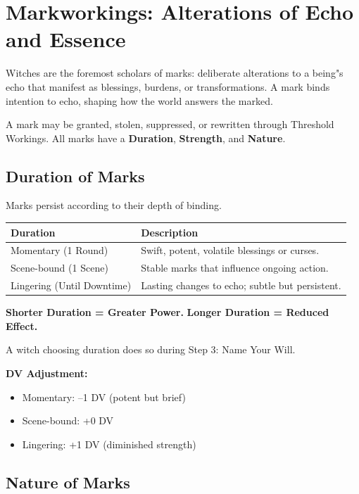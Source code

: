 \documentclass[11pt]{book}
\begin{document}
\section*{Markworkings: Alterations of Echo and Essence}

Witches are the foremost scholars of marks: deliberate alterations to a being"s
echo that manifest as blessings, burdens, or transformations. A mark binds intention
to echo, shaping how the world answers the marked.

A mark may be granted, stolen, suppressed, or rewritten through Threshold Workings.
All marks have a \textbf{Duration}, \textbf{Strength}, and \textbf{Nature}.

\subsection*{Duration of Marks}

Marks persist according to their depth of binding.

\begin{center}
\begin{longtable}{p{} p{}}
\toprule
\textbf{Duration} & \textbf{Description} \\
\midrule
Momentary (1 Round) & Swift, potent, volatile blessings or curses. \\
Scene-bound (1 Scene) & Stable marks that influence ongoing action. \\
Lingering (Until Downtime) & Lasting changes to echo; subtle but persistent. \\
\bottomrule
\end{longtable}
\end{center}

\textbf{Shorter Duration = Greater Power.}  
\textbf{Longer Duration = Reduced Effect.}

A witch choosing duration does so during Step 3: Name Your Will.

\textbf{DV Adjustment:}
\begin{itemize}[noitemsep]
    \item Momentary: --1 DV (potent but brief)
    \item Scene-bound: +0 DV
    \item Lingering: +1 DV (diminished strength)
\end{itemize}

\subsection*{Nature of Marks}
\end{document}
